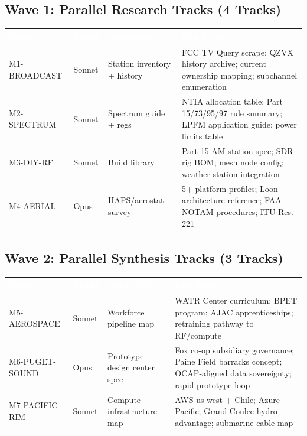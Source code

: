 \documentclass[11pt,letterpaper]{article}
\newcommand{\tableheader}[1]{\textbf{\sffamily\textcolor{white}{#1}}}
\begin{document}
\subsection{Wave 1: Parallel Research Tracks (4 Tracks)}

\begin{center}
\begin{tabularx}{\textwidth}{L{2.5cm}L{2cm}L{2.5cm}X}
\toprule
{}
\tableheader{Track} & \tableheader{Model} & \tableheader{Deliverable} & \tableheader{Key Tasks} \\
\midrule
M1-BROADCAST & Sonnet & Station inventory + history & FCC TV Query scrape; QZVX history archive; current ownership mapping; subchannel enumeration \\
M2-SPECTRUM & Sonnet & Spectrum guide + regs & NTIA allocation table; Part 15/73/95/97 rule summary; LPFM application guide; power limits table \\
M3-DIY-RF & Sonnet & Build library & Part 15 AM station spec; SDR rig BOM; mesh node config; weather station integration \\
M4-AERIAL & Opus & HAPS/aerostat survey & 5+ platform profiles; Loon architecture reference; FAA NOTAM procedures; ITU Res. 221 \\
\bottomrule
\end{tabularx}
\end{center}

\subsection{Wave 2: Parallel Synthesis Tracks (3 Tracks)}

\begin{center}
\begin{tabularx}{\textwidth}{L{2.8cm}L{2cm}L{2.8cm}X}
\toprule
{}
\tableheader{Track} & \tableheader{Model} & \tableheader{Deliverable} & \tableheader{Key Tasks} \\
\midrule
M5-AEROSPACE & Sonnet & Workforce pipeline map & WATR Center curriculum; BPET program; AJAC apprenticeships; retraining pathway to RF/compute \\
M6-PUGET-SOUND & Opus & Prototype design center spec & Fox co-op subsidiary governance; Paine Field barracks concept; OCAP-aligned data sovereignty; rapid prototype loop \\
M7-PACIFIC-RIM & Sonnet & Compute infrastructure map & AWS us-west + Chile; Azure Pacific; Grand Coulee hydro advantage; submarine cable map \\
\bottomrule
\end{tabularx}
\end{center}
\end{document}
